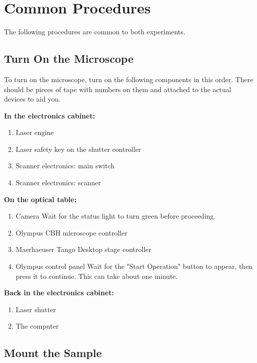 \documentclass[10pt,a4paper,oneside]{book}
\begin{document}
\section{Common Procedures}

The following procedures are common to both experiments.

\subsection{Turn On the Microscope}\label{sec:startup}

To turn on the microscope, turn on the following components in this order. There should be pieces of tape with numbers on them and attached to the actual devices to aid you.

\textbf{In the electronics cabinet:}

\begin{enumerate}
    \item Laser engine
    \item Laser safety key on the shutter controller
    \item Scanner electronics: main switch
    \item Scanner electronics: scanner
\end{enumerate}

\textbf{On the optical table:}

\begin{enumerate}
    \item Camera \newline Wait for the status light to turn green before proceeding.
    \item Olympus CBH microscope controller
    \item Maerhaeuser Tango Desktop stage controller
    \item Olympus control panel \newline Wait for the "Start Operation" button to appear, then press it to continue. This can take about one minute.
\end{enumerate}

\textbf{Back in the electronics cabinet:}

\begin{enumerate}
    \item Laser shutter
    \item The computer
\end{enumerate}

\subsection{Mount the Sample}\label{sec:mount-sample}
\end{document}
